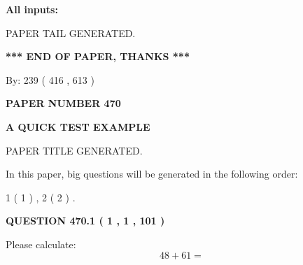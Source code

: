 \documentclass[12pt]{article}
\begin{document}
   
\noindent{}
   
   
   
   
\noindent\vspace{0.1in}\hspace{-0.08in} {\textbf{\Large{All inputs: }}}
   
   
   
   
   
   
 \vspace{0.2in}
 
   
   
\vspace{2.0in} PAPER TAIL GENERATED.
   
   
   
   
\vspace{1.0in} 
{\textbf{\large{ *** END OF PAPER, THANKS *** }}} 
   
   
\hspace{1.0in} By: 
 239 ( 416 ,  613 )
   
   
   
   
\newpage 
\setcounter{page}{ 
   470001 } 
   
   
   
   
 {\textbf{ \Large{ PAPER NUMBER  470  }}}
   
   
\vspace{0.2in}
   
   
   
   
   
   
   
   
 \vspace{0.2in}
{\LARGE {\textbf{ A QUICK TEST EXAMPLE}}}
   
   
 PAPER TITLE GENERATED.
   
   
   
\vspace{0.2in}
   
In this paper, big questions will be generated in the following order: 
   
   
   1 ( 1 )
 ,
   2 ( 2 )
 .
  
\vspace{0.2in}
  
{\textbf{\Large{QUESTION
470.1 
 ( 1 , 1 , 101 )
}}}
  
  
 
Please calculate:
\begin{equation}
48 +  %
61 = \nonumber
\end{equation}
 
\end{document}
